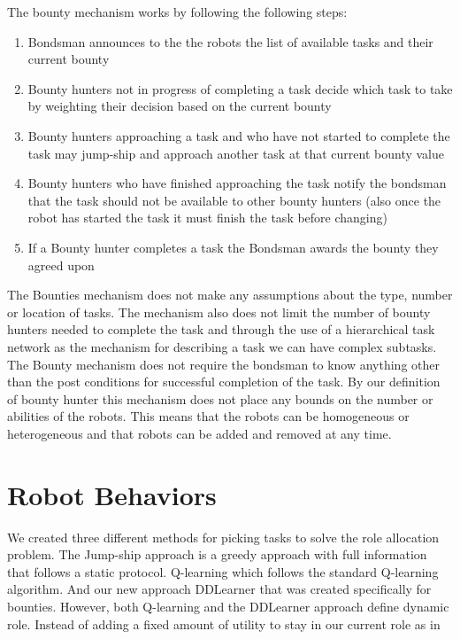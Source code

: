 \documentclass[twocolumn]{article}
\begin{document}
The bounty mechanism works by following the following steps:

\begin{enumerate}
\item Bondsman announces to the the robots the list of available tasks and their current bounty
\item Bounty hunters not in progress of completing a task decide which task to take by weighting their decision based on the current bounty
\item Bounty hunters approaching a task and who have not started to complete the task may jump-ship and approach another task at that current bounty value
\item Bounty hunters who have finished approaching the task notify the bondsman that the task should not be available to other bounty hunters (also once the robot has started the task it must finish the task before changing) %
\item If a Bounty hunter completes a task the Bondsman awards the bounty they agreed upon
\end{enumerate}

The Bounties mechanism does not make any assumptions about the type, number or location of tasks.  The mechanism also does not limit the number of bounty hunters needed to complete the task and through the use of a hierarchical task network as the mechanism for describing a task we can have complex subtasks.  The Bounty mechanism does not require the bondsman to know anything other than the post conditions for successful completion of the task.  By our definition of bounty hunter this mechanism does not place any bounds on the number or abilities of the robots.  This means that the robots can be homogeneous or heterogeneous and that robots can be added and removed at any time.

\section{Robot Behaviors}
We created three different methods for picking tasks to solve the role allocation problem.  The Jump-ship approach is a greedy approach with full information that follows a static protocol.  Q-learning which follows the standard Q-learning algorithm.  And our new approach DDLearner that was created specifically for bounties.  However, both Q-learning and the DDLearner approach define dynamic role.  Instead of adding a fixed amount of utility to stay in our current role as in \cite{Brusey2001} 
\end{document}
